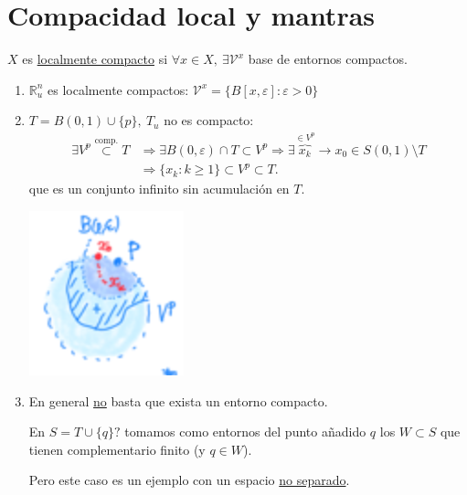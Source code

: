 \section{Compacidad local y mantras}%
\label{sec:compacidad_local_y_mantras}
\begin{defi}
$X$ es \underline{localmente compacto} si $\forall x \in X,\ \exists \mathcal{V}^x$ base de entornos compactos.
\end{defi}

\begin{ej}
\begin{enumerate}
    \item $\mathbb{R}_u^n$ es localmente compactos: $\mathcal{V}^x = \{B\left[ x, \varepsilon \right] : \varepsilon > 0\}$

    \item $T = B\left( 0, 1 \right) \cup \{p\},\ T_u$ no es compacto:
    \begin{align*}
        \exists V^p \stackrel{\text{comp.}}{\subset} T &\Rightarrow \exists B\left( 0, \varepsilon \right) \cap T \subset V^p \Rightarrow \exists \overbrace{x_k}^{\in V^p} \rightarrow x_0 \in S\left( 0, 1 \right) \setminus T\\
       &\Rightarrow \{x_k : k \ge 1\} \subset V^p \subset T 
    .\end{align*}
    que es un conjunto infinito sin acumulación en $T$.
    \begin{center}
        \includegraphics[scale=0.3]{images/loc_comp_ej_2} 
    \end{center}

    \item En general \underline{no} basta que exista un entorno compacto.

    En $S = T \cup \{q\}?$ tomamos como entornos del punto añadido $q$ los $W \subset S$ que tienen complementario finito (y $q \in W$).

    Pero este caso es un ejemplo con un espacio \underline{no separado}.
\end{enumerate}
\end{ej}

